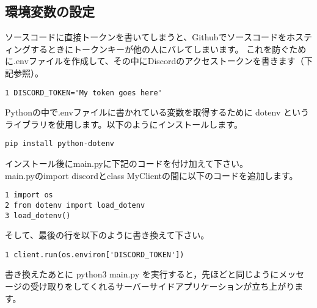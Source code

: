 \subsection{環境変数の設定}
ソースコードに直接トークンを書いてしまうと、Githubでソースコードをホスティングするときにトークンキーが他の人にバレてしまいます。
これを防ぐために.envファイルを作成して、その中にDiscordのアクセストークンを書きます（下記参照）。
\begin{tcolorbox}[breakable]
\begin{verbatim}
1 DISCORD_TOKEN='My token goes here'
\end{verbatim}
\end{tcolorbox}
Pythonの中で.envファイルに書かれている変数を取得するために dotenv というライブラリを使用します。以下のようにインストールします。
\begin{shaded}
\begin{verbatim}
pip install python-dotenv
\end{verbatim}
\end{shaded}
インストール後にmain.pyに下記のコードを付け加えて下さい。\\
main.pyのimport discordとclass MyClientの間に以下のコードを追加します。
\begin{tcolorbox}[breakable]
\begin{verbatim}
1 import os
2 from dotenv import load_dotenv
3 load_dotenv()
\end{verbatim}
\end{tcolorbox}
そして、最後の行を以下のように書き換えて下さい。
\begin{tcolorbox}[breakable]
\begin{verbatim}
1 client.run(os.environ['DISCORD_TOKEN'])
\end{verbatim}
\end{tcolorbox}
書き換えたあとに python3 main.py を実行すると，先ほどと同じようにメッセージの受け取りをしてくれるサーバーサイドアプリケーションが立ち上がります。

